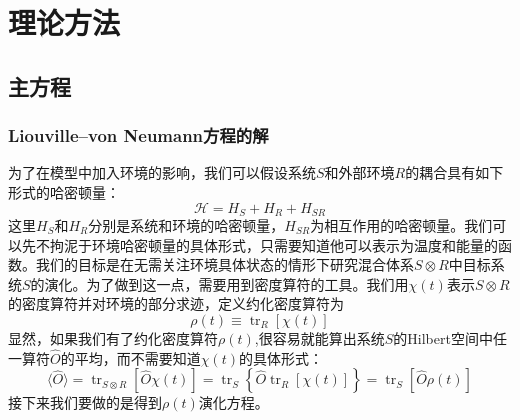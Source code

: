 
\chapter{理论方法}
\label{ch3}

\section{主方程}

\subsection{Liouville--von Neumann方程的解}
为了在模型中加入环境的影响，我们可以假设系统$S$和外部环境$R$的耦合具有如下形式的哈密顿量：
\begin{equation}
\mathcal{H}=H_{S}+H_{R}+H_{S R}
\label{Hsr}
\end{equation}
这里$H_{S}$和$H_{R}$分别是系统和环境的哈密顿量，$H_{SR}$为相互作用的哈密顿量。我们可以先不拘泥于环境哈密顿量的具体形式，只需要知道他可以表示为温度和能量的函数。我们的目标是在无需关注环境具体状态的情形下研究混合体系$S \otimes R$中目标系统$S$的演化。为了做到这一点，需要用到密度算符的工具。我们用$\chi(t)$表示$S \otimes R$的密度算符并对环境的部分求迹，定义约化密度算符为
\begin{equation}
\rho(t) \equiv \operatorname{tr}_{R}[\chi(t)]
\end{equation}
显然，如果我们有了约化密度算符$\rho(t)$,很容易就能算出系统$S$的Hilbert空间中任一算符$\hat{O}$的平均，而不需要知道$\chi(t)$的具体形式：
\begin{equation}
\langle\hat{O}\rangle=\operatorname{tr}_{S \otimes R}[\hat{O} \chi(t)]=\operatorname{tr}_{S}\left\{\hat{O} \operatorname{tr}_{R}[\chi(t)]\right\}=\operatorname{tr}_{S}[\hat{O} \rho(t)]
\end{equation}
接下来我们要做的是得到$\rho(t)$演化方程。

